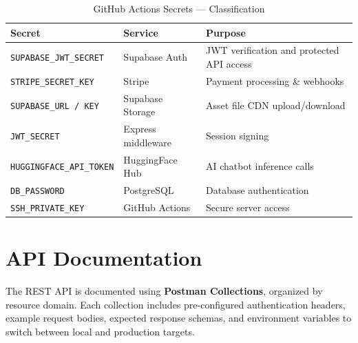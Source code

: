 \begin{table}[H]
\centering
\caption{GitHub Actions Secrets --- Classification}
\begin{tabular}{L{4.5cm} L{4cm} L{5cm}}
\toprule
\textbf{Secret} & \textbf{Service} & \textbf{Purpose} \\
\midrule
\texttt{SUPABASE\_JWT\_SECRET}      & Supabase Auth      & JWT verification and protected API access \\
\texttt{STRIPE\_SECRET\_KEY}        & Stripe             & Payment processing \& webhooks \\
\texttt{SUPABASE\_URL / KEY}        & Supabase Storage   & Asset file CDN upload/download \\
\texttt{JWT\_SECRET}                & Express middleware & Session signing \\
\texttt{HUGGINGFACE\_API\_TOKEN}    & HuggingFace Hub    & AI chatbot inference calls \\
\texttt{DB\_PASSWORD}               & PostgreSQL         & Database authentication \\
\texttt{SSH\_PRIVATE\_KEY}          & GitHub Actions     & Secure server access \\
\bottomrule
\end{tabular}
\end{table}

\section{API Documentation}

The REST API is documented using \textbf{Postman Collections}, organized by resource domain. Each collection includes pre-configured authentication headers, example request bodies, expected response schemas, and environment variables to switch between local and production targets.

